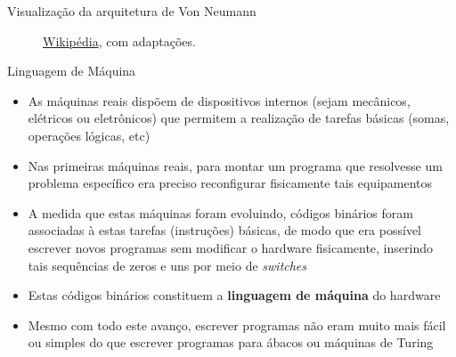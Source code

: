 \begin{frame}[fragile]{Visualização da arquitetura de Von Neumann}
\begin{figure}[ht]

        \caption{\href{https://upload.wikimedia.org/wikipedia/commons/e/e5/Von_Neumann_Architecture.svg}{Wikipédia}, com adaptações.}
    \end{figure}
\end{frame}

\begin{frame}[fragile]{Linguagem de Máquina}

    \begin{itemize}
        \item As máquinas reais dispõem de dispositivos internos (sejam mecânicos, elétricos ou
            eletrônicos) que permitem a realização de tarefas básicas (somas, operações lógicas,
            etc)

        \item Nas primeiras máquinas reais, para montar um programa que resolvesse um problema 
            específico era preciso reconfigurar fisicamente tais equipamentos

        \item A medida que estas máquinas foram evoluindo, códigos binários foram associadas à 
            estas tarefas (instruções) básicas, de modo que era possível escrever novos programas
            sem modificar o hardware fisicamente, inserindo tais sequências de zeros e uns por
            meio de \textit{switches}

        \item Estas códigos binários constituem a \textbf{linguagem de máquina} do hardware

        \item Mesmo com todo este avanço, escrever programas não eram muito mais fácil ou simples
            do que escrever programas para ábacos ou máquinas de Turing
    \end{itemize}

\end{frame}

